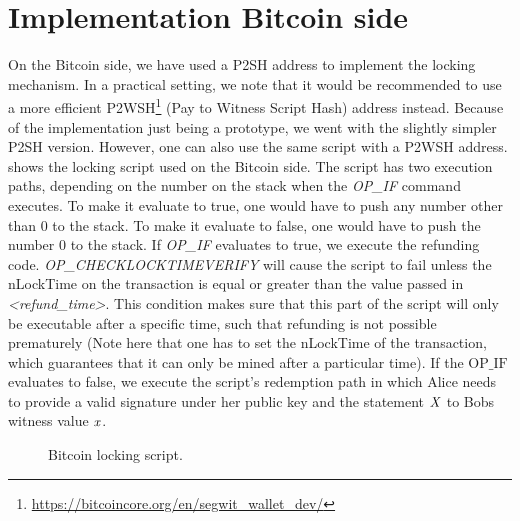 \section{Implementation Bitcoin side}\label{sec:ImplementationBtc}

On the Bitcoin side, we have used a P2SH address to implement the locking mechanism.
In a practical setting, we note that it would be recommended to use a more efficient P2WSH\footnote{\url{https://bitcoincore.org/en/segwit_wallet_dev/}} (Pay to Witness Script Hash) address instead.
Because of the implementation just being a prototype, we went with the slightly simpler P2SH version.
However, one can also use the same script with a P2WSH address.
 shows the locking script used on the Bitcoin side.
The script has two execution paths, depending on the number on the stack when the \textit{OP\_IF} command executes.
To make it evaluate to true, one would have to push any number other than 0 to the stack.
To make it evaluate to false, one would have to push the number 0 to the stack.
If \textit{OP\_IF} evaluates to true, we execute the refunding code.
\textit{OP\_CHECKLOCKTIMEVERIFY} will cause the script to fail unless the nLockTime on the transaction is equal or greater than the value passed in \textit{<refund\_time>}.
This condition makes sure that this part of the script will only be executable after a specific time, such that refunding is not possible prematurely (Note here that one has to set the nLockTime of the transaction, which guarantees that it can only be mined after a particular time).
If the $\text{OP\_IF}$ evaluates to false, we execute the script's redemption path in which Alice needs to provide a valid signature under her public key and the statement $\mathit{X}$ to Bobs witness value $\mathit{x}$.

\begin{figure}
    \begin{center}
    \end{center}
    \caption{Bitcoin locking script.}\label{fig:bitcoin-script}
\end{figure}

